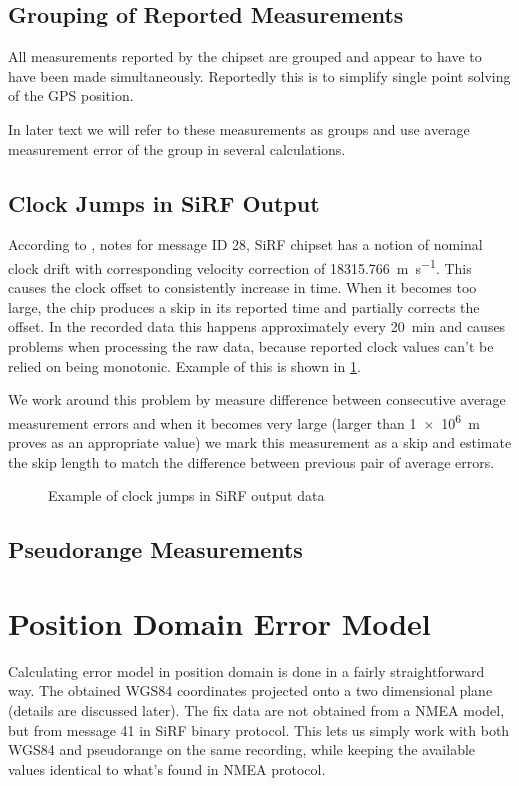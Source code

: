 \subsection{Grouping of Reported Measurements}
All measurements reported by the chipset are grouped and appear
to have to have been made simultaneously.
Reportedly this is to simplify single point solving of the GPS position.

In later text we will refer to these measurements as groups and use average
measurement error of the group in several calculations.

\subsection{Clock Jumps in SiRF Output}
According to \cite{sirf-protocol}, notes for message ID 28, SiRF chipset has a
notion of nominal clock drift with corresponding velocity correction of \SI{18315.766}{\meter\per\second}.
This causes the clock offset to consistently increase in time.
When it becomes too large, the chip produces a skip in its reported time and
partially corrects the offset.
In the recorded data this happens approximately every \SI{20}{\minute} and causes
problems when processing the raw data, because reported clock values
can't be relied on being monotonic.
Example of this is shown in \cref{fig:impl-clock-jumps}.

We work around this problem by measure difference between consecutive average
measurement errors and when it becomes very large (larger than \SI{1e6}{\meter} proves as an
appropriate value) we mark this measurement as a skip and estimate the skip
length to match the difference between previous pair of average errors.

\begin{figure}[tp]
	\centering
	\caption{Example of clock jumps in SiRF output data}
	\label{fig:impl-clock-jumps}
\end{figure}

\subsection{Pseudorange Measurements}

\section{Position Domain Error Model}
Calculating error model in position domain is done in a fairly straightforward way.
The obtained WGS84 coordinates projected onto a two dimensional plane
(details are discussed later).
The fix data are not obtained from a NMEA model, but from message 41 in SiRF
binary protocol.
This lets us simply work with both WGS84 and pseudorange on the same recording,
while keeping the available values identical to what's found in NMEA protocol.

